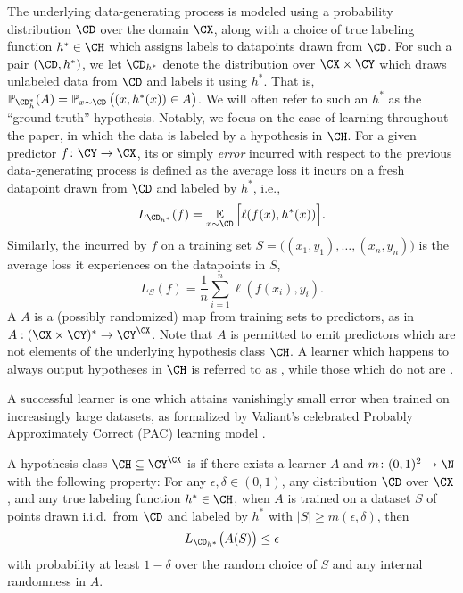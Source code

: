 \documentclass[11pt]{article}
\begin{document}
The underlying data-generating process is modeled using a probability distribution $\CD$ over the domain $\CX$, along with a choice of true labeling function $h^* \in \CH$ which assigns labels to datapoints drawn from $\CD$. For such a pair $(\CD, h^*)$, we let $\CD_{h^*}$ denote the distribution over $\CX \times \CY$ which draws unlabeled data from $\CD$ and labels it using $h^*$. That is, $\P_{\CD_h^*}(A) = \P_{x \sim \CD}\big((x, h^*(x)) \in A \big)$. We will often refer to such an $h^*$ as the ``ground truth'' hypothesis. Notably, we focus on the case of  learning throughout the paper, in which the data is labeled by a hypothesis in $\CH$. For a given predictor $f \colon \CY \to \CX$, its  or simply \emph{error} incurred with respect to the previous data-generating process is defined as the average loss it incurs on a fresh datapoint drawn from $\CD$ and labeled by $h^*$, i.e., 
\[ L_{\CD_{h^*}}(f) = \E_{x \sim \CD} \Big[ \ell(f(x), h^*(x)) \Big] . \]
Similarly, the  incurred by $f$ on a training set $S = \big((x_1, y_1), \ldots, (x_n, y_n) \big)$ is the average loss it experiences on the datapoints in $S$, 
\[ L_S(f) = \frac{1}{n} \sum_{i=1}^n \ell(f(x_i), y_i). \]
A  $A$ is a (possibly randomized) map from training sets to predictors, as in $A: (\CX \times \CY)^* \to \CY^\CX$. Note that $A$ is permitted to emit predictors which are not elements of the underlying hypothesis class $\CH$. A learner which happens to always output hypotheses in $\CH$ is referred to as , while those which do not are . 

A successful learner is one which attains vanishingly small error when trained on increasingly large datasets, as formalized by Valiant's celebrated Probably Approximately Correct (PAC) learning model \citep{valiant1984theory}. 

\begin{definition}\label{Definition:PAC-learning}
A hypothesis class $\CH \subseteq \CY^\CX$ is  if there exists a learner $A$ and  $m \colon (0, 1)^2 \to \N$ with the following property: For any $\epsilon, \delta \in (0, 1)$, any distribution $\CD$ over $\CX$, and any true labeling function $h^* \in \CH$, when $A$ is trained on a dataset $S$ of points drawn i.i.d.\ from $\CD$ and labeled by $h^*$ with $|S| \geq m(\epsilon, \delta)$, then 
\[ L_{\CD_{h^*}} \big( A(S) \big) \leq \epsilon \]
with probability at least $1 - \delta$ over the random choice of $S$ and any internal randomness in $A$. 
\end{definition}
\end{document}
